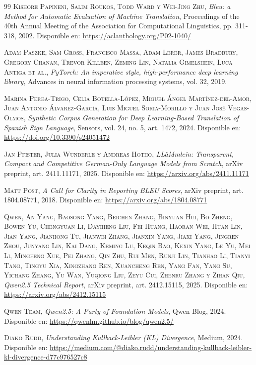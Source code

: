 \begin{thebibliography}{99}
 \textsc{Kishore Papineni, Salim Roukos, Todd Ward y Wei-Jing Zhu}, \textit{Bleu: a Method for Automatic Evaluation of Machine Translation}, Proceedings of the 40th Annual Meeting of the Association for Computational Linguistics, pp. 311-318, 2002. Disponible en: \url{https://aclanthology.org/P02-1040/}

 \textsc{Adam Paszke, Sam Gross, Francisco Massa, Adam Lerer, James Bradbury, Gregory Chanan, Trevor Killeen, Zeming Lin, Natalia Gimelshein, Luca Antiga et al.}, \textit{PyTorch: An imperative style, high-performance deep learning library}, Advances in neural information processing systems, vol. 32, 2019.

 \textsc{Marina Perea-Trigo, Celia Botella-López, Miguel Ángel Martínez-del-Amor, Juan Antonio Álvarez-García, Luis Miguel Soria-Morillo y Juan José Vegas-Olmos}, \textit{Synthetic Corpus Generation for Deep Learning-Based Translation of Spanish Sign Language}, Sensors, vol. 24, no. 5, art. 1472, 2024. Disponible en: \url{https://doi.org/10.3390/s24051472}

 \textsc{Jan Pfister, Julia Wunderle y Andreas Hotho}, \textit{LLäMmlein: Transparent, Compact and Competitive German-Only Language Models from Scratch}, arXiv preprint, art. 2411.11171, 2025. Disponible en: \url{https://arxiv.org/abs/2411.11171}

 \textsc{Matt Post}, \textit{A Call for Clarity in Reporting BLEU Scores}, arXiv preprint, art. 1804.08771, 2018. Disponible en: \url{https://arxiv.org/abs/1804.08771}

 \textsc{Qwen, An Yang, Baosong Yang, Beichen Zhang, Binyuan Hui, Bo Zheng, Bowen Yu, Chengyuan Li, Dayiheng Liu, Fei Huang, Haoran Wei, Huan Lin, Jian Yang, Jianhong Tu, Jianwei Zhang, Jianxin Yang, Jiaxi Yang, Jingren Zhou, Junyang Lin, Kai Dang, Keming Lu, Keqin Bao, Kexin Yang, Le Yu, Mei Li, Mingfeng Xue, Pei Zhang, Qin Zhu, Rui Men, Runji Lin, Tianhao Li, Tianyi Tang, Tingyu Xia, Xingzhang Ren, Xuancheng Ren, Yang Fan, Yang Su, Yichang Zhang, Yu Wan, Yuqiong Liu, Zeyu Cui, Zhenru Zhang y Zihan Qiu}, \textit{Qwen2.5 Technical Report}, arXiv preprint, art. 2412.15115, 2025. Disponible en: \url{https://arxiv.org/abs/2412.15115}

 \textsc{Qwen Team}, \textit{Qwen2.5: A Party of Foundation Models}, Qwen Blog, 2024. Disponible en: \url{https://qwenlm.github.io/blog/qwen2.5/}

 \textsc{Diako Rudd}, \textit{Understanding Kullback-Leibler (KL) Divergence}, Medium, 2024. Disponible en: \url{https://medium.com/@diako.rudd/understanding-kullback-leibler-kl-divergence-d77c976527c8}


\end{thebibliography}
